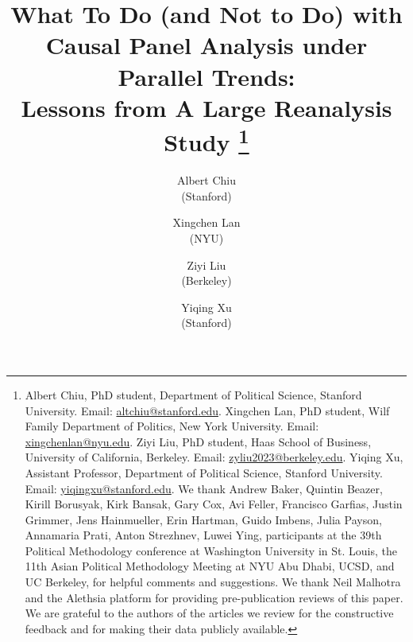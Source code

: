 \documentclass[12pt]{article}
\begin{document}
%

\title{\Large\bf What To Do (and Not to Do) with Causal Panel Analysis under  
Parallel Trends:\\Lessons from A Large Reanalysis Study%
\thanks{Albert Chiu, PhD student, Department of Political Science, Stanford University. Email: \url{altchiu@stanford.edu}. Xingchen Lan, PhD student, Wilf Family Department of Politics, New York University. Email: \url{xingchenlan@nyu.edu}. Ziyi Liu, PhD student, Haas School of Business, University of California, Berkeley. Email: \url{zyliu2023@berkeley.edu}. Yiqing Xu, Assistant Professor, Department of Political Science, Stanford University. Email: \url{yiqingxu@stanford.edu}. We thank Andrew Baker, Quintin Beazer, Kirill Borusyak, Kirk Bansak, Gary Cox, Avi Feller, Francisco Garfias, Justin Grimmer, Jens Hainmueller, Erin Hartman, Guido Imbens, Julia Payson, Annamaria Prati, Anton Strezhnev, Luwei Ying, participants at the 39th Political Methodology conference at Washington University in St. Louis, the 11th Asian Political Methodology Meeting at NYU Abu Dhabi, UCSD, and UC Berkeley, for helpful comments and suggestions. We thank Neil Malhotra and the Alethsia platform for providing pre-publication reviews of this paper. We are grateful to the authors of the articles we review for the constructive feedback and for making their data publicly available.}}


\author{Albert Chiu \\(Stanford)\and Xingchen Lan\\(NYU)\and Ziyi Liu\\(Berkeley)\and Yiqing Xu\\(Stanford)}

\date{}

\maketitle
\end{document}
